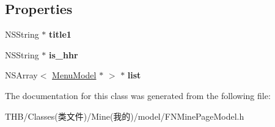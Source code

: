 \subsection*{Properties}
\begin{DoxyCompactItemize}
\item 
\mbox{\label{interface_j_m___m_p_m__hhr_ac04a5abbd41012e741156d9fbfd91153}} 
N\+S\+String $\ast$ {\bfseries title1}
\item 
\mbox{\label{interface_j_m___m_p_m__hhr_a5be95a77cd4388f0b6d424d6a259292f}} 
N\+S\+String $\ast$ {\bfseries is\+\_\+hhr}
\item 
\mbox{\label{interface_j_m___m_p_m__hhr_acda53b69200c5a8cbbffd495bcf64ae2}} 
N\+S\+Array$<$ \mbox{\hyperlink{interface_menu_model}{Menu\+Model}} $\ast$ $>$ $\ast$ {\bfseries list}
\end{DoxyCompactItemize}


The documentation for this class was generated from the following file\+:\begin{DoxyCompactItemize}
\item 
T\+H\+B/\+Classes(类文件)/\+Mine(我的)/model/F\+N\+Mine\+Page\+Model.\+h\end{DoxyCompactItemize}
